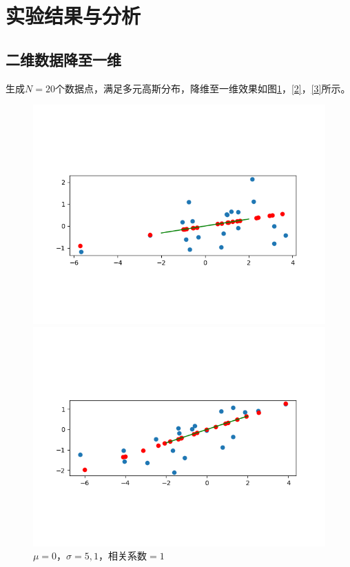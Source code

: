 \section{实验结果与分析}

\subsection{二维数据降至一维}

生成$N=20$个数据点，满足多元高斯分布，降维至一维效果如图\ref{1}，\ref{2}，\ref{3}所示。

\begin{figure}[htbp]
    \begin{minipage}[t]{0.3\linewidth}
        \centering
        \includegraphics[width=\textwidth]{figures/Figure_4.png}
        \caption{$\mu=0$，$\sigma=5,1$，相关系数$=1$}
        \label{1}
    \end{minipage}
    \begin{minipage}[t]{0.3\linewidth}
        \centering
        \includegraphics[width=\textwidth]{figures/Figure_5.png}

\end{minipage}
\end{figure}
